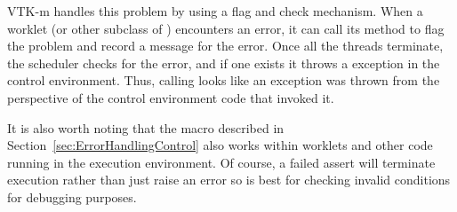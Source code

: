 VTK-m handles this problem by using a flag and check mechanism. When a
worklet (or other subclass of ) encounters an error,
it can call its  method to flag the problem and record
a message for the error. Once all the threads terminate, the scheduler
checks for the error, and if one exists it throws a
 exception in the control environment. Thus,
calling  looks like an exception was thrown from the
perspective of the control environment code that invoked it.




It is also worth noting that the  macro described
in Section~\ref{sec:ErrorHandlingControl} also works within worklets and
other code running in the execution environment. Of course, a failed assert
will terminate execution rather than just raise an error so is best for
checking invalid conditions for debugging purposes.



